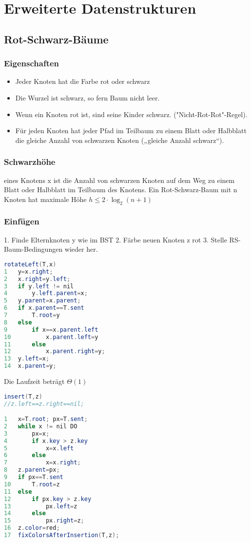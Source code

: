 \documentclass[jou,apacite]{apa6}
\begin{document}
\section{Erweiterte Datenstrukturen}

\subsection{Rot-Schwarz-Bäume}
\subsubsection{Eigenschaften}
\begin{itemize}
    \item Jeder Knoten hat die Farbe rot oder schwarz
    \item Die Wurzel ist schwarz, so fern Baum nicht leer.
    \item Wenn ein Knoten rot ist, sind seine Kinder schwarz. ("Nicht-Rot-Rot"-Regel).
    \item Für jeden Knoten hat jeder Pfad im Teilbaum zu einem Blatt oder Halbblatt die gleiche Anzahl von schwarzen Knoten („gleiche Anzahl schwarz“).
\end{itemize}

\subsubsection{Schwarzhöhe} eines Knotens x ist die Anzahl von schwarzen Knoten auf dem Weg zu einem Blatt oder Halbblatt im Teilbaum des Knotens. Ein Rot-Schwarz-Baum mit n Knoten hat maximale Höhe $h\le2\cdot\log_2(n+1)$

\subsubsection{Einfügen} 1. Finde Elternknoten y wie im BST 2. Färbe neuen Knoten z rot 3. Stelle RS-Baum-Bedingungen wieder her. 
\begin{lstlisting}[language=java]
rotateLeft(T,x)
1   y=x.right;
2   x.right=y.left;
3   if y.left != nil 
4       y.left.parent=x;
5   y.parent=x.parent;
6   if x.parent==T.sent 
7       T.root=y
8   else
9       if x==x.parent.left 
10          x.parent.left=y
11      else
12          x.parent.right=y;
13  y.left=x;
14  x.parent=y;
\end{lstlisting}
Die Laufzeit beträgt $\Theta(1)$

\begin{lstlisting}[language=java]
insert(T,z)
//z.left==z.right==nil;

1   x=T.root; px=T.sent;
2   while x != nil DO
3       px=x;
4       if x.key > z.key 
5           x=x.left
6       else
7           x=x.right;
8   z.parent=px;
9   if px==T.sent 
10      T.root=z
11  else
12      if px.key > z.key 
13          px.left=z
14      else
15          px.right=z;
16  z.color=red;
17  fixColorsAfterInsertion(T,z);
\end{lstlisting}
\end{document}
